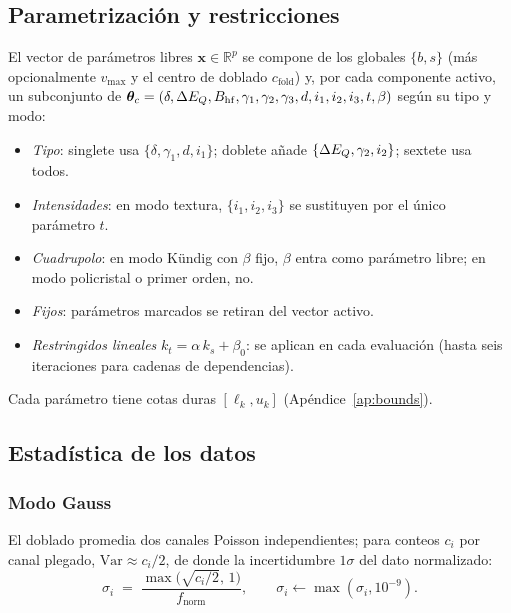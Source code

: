 \subsection{Parametrización y restricciones}\label{sec:disc-param}

El vector de parámetros libres $\bm x\in\mathbb R^{p}$ se compone de los globales
$\{b,s\}$ (más opcionalmente $v_{\max}$ y el centro de doblado $c_{\text{fold}}$) y,
por cada componente activo, un subconjunto de
$\bm\theta_c=(\delta,\Delta E_{Q},B_{\mathrm{hf}},\gamma_1,\gamma_2,\gamma_3,d,i_1,i_2,i_3,t,\beta)$
según su tipo y modo:
\begin{itemize}[leftmargin=*]
  \item \emph{Tipo}: singlete usa $\{\delta,\gamma_1,d,i_1\}$; doblete añade
        $\{\Delta E_{Q},\gamma_2,i_2\}$; sextete usa todos.
  \item \emph{Intensidades}: en modo textura, $\{i_1,i_2,i_3\}$ se sustituyen por
        el único parámetro $t$.
  \item \emph{Cuadrupolo}: en modo Kündig con $\beta$ fijo, $\beta$ entra como
        parámetro libre; en modo policristal o primer orden, no.
  \item \emph{Fijos}: parámetros marcados se retiran del vector activo.
  \item \emph{Restringidos lineales} $k_t=\alpha\,k_s+\beta_0$: se aplican en cada
        evaluación (hasta seis iteraciones para cadenas de dependencias).
\end{itemize}
Cada parámetro tiene cotas duras $[\ell_k,u_k]$ (Apéndice~\ref{ap:bounds}).

\subsection{Estadística de los datos}\label{sec:weighting}

\subsubsection{Modo Gauss}
El doblado promedia dos canales Poisson independientes; para conteos $c_i$ por
canal plegado, $\mathrm{Var}\approx c_i/2$, de donde la incertidumbre $1\sigma$
del dato normalizado:
\begin{equation}
  \sigma_i \;=\; \frac{\max\!\bigl(\sqrt{c_i/2},\,1\bigr)}{f_{\text{norm}}},
  \qquad \sigma_i\leftarrow\max(\sigma_i,10^{-9}).
  \label{eq:sigma-gauss}
\end{equation}

